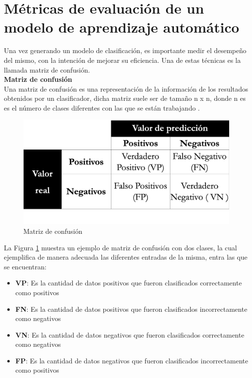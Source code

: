 

\section[Métricas de evaluación]{Métricas de evaluación de un modelo de aprendizaje automático}

Una vez generando un modelo de clasificación, es importante medir el desempeño del mismo, con
la intención de mejorar su eficiencia. Una de estas técnicas es la llamada matriz de confusión.\\

\textbf{Matriz de confusión}\\

Una matriz de confusión es una representación de la información de los resultados obtenidos por un
clasificador, dicha matriz suele ser de tamaño n x n, donde n es es el número de clases diferentes con
las que se están trabajando \citep{CT23}.

\begin{figure}
	\centering
	\includegraphics[scale=.4]{imagenes/Capitulo3/MatrizC.png}
	\caption{Matriz de confusión}
	\label{Fig:mconfu}
\end{figure}

La Figura \ref{Fig:mconfu} muestra un ejemplo de matriz de confusión con dos clases, la cual ejemplifica de
manera adecuada las diferentes entradas de la misma, entra las que se encuentran:


\begin{itemize}

	\item \textbf{VP}: Es la cantidad de datos positivos que fueron clasificados correctamente como positivos 
	\item \textbf{FN}: Es la cantidad de datos positivos que fueron clasificados incorrectamente como negativos
	\item \textbf{VN}: Es la cantidad de datos negativos que fueron clasificados correctamente como negativos
	\item \textbf{FP}: Es la cantidad de datos negativos que fueron clasificados incorrectamente como positivos
	
\end{itemize}

